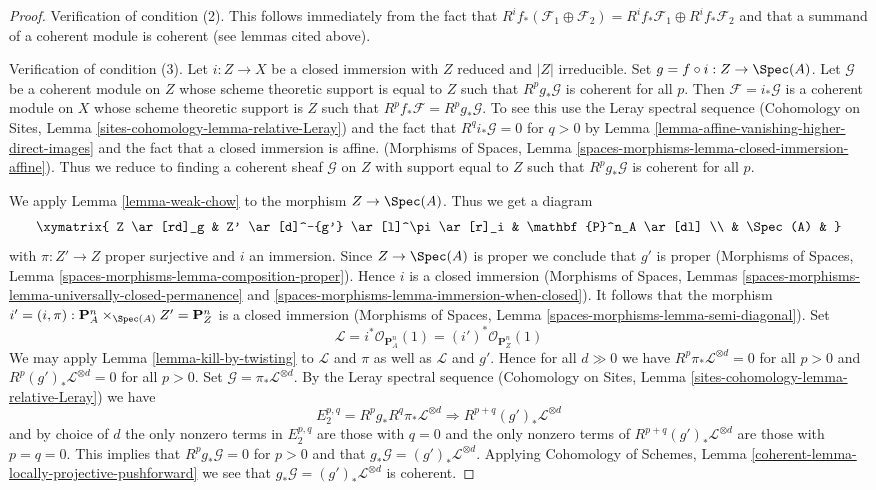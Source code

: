 \begin{proof}
\medskip\noindent
Verification of condition (2). This follows immediately from the fact
that $R^if_*(\mathcal{F}_1 \oplus \mathcal{F}_2) =
R^if_*\mathcal{F}_1 \oplus R^if_*\mathcal{F}_2$ and that a summand
of a coherent module is coherent (see lemmas cited above).

\medskip\noindent
Verification of condition (3). Let $i : Z \to X$ be a closed immersion
with $Z$ reduced and $|Z|$ irreducible. Set $g = f \circ i : Z \to \Spec(A)$.
Let $\mathcal{G}$ be a coherent module on $Z$ whose scheme theoretic support
is equal to $Z$ such that $R^pg_*\mathcal{G}$ is coherent for all $p$.
Then $\mathcal{F} = i_*\mathcal{G}$ is a coherent module on
$X$ whose scheme theoretic support is $Z$ such that
$R^pf_*\mathcal{F} = R^pg_*\mathcal{G}$. To see this use
the Leray spectral sequence
(Cohomology on Sites, Lemma \ref{sites-cohomology-lemma-relative-Leray})
and the fact that $R^qi_*\mathcal{G} = 0$ for $q > 0$ by
Lemma \ref{lemma-affine-vanishing-higher-direct-images}
and the fact that a closed immersion is affine.
(Morphisms of Spaces, Lemma
\ref{spaces-morphisms-lemma-closed-immersion-affine}).
Thus we reduce to finding a coherent sheaf $\mathcal{G}$ on $Z$
with support equal to $Z$ such that $R^pg_*\mathcal{G}$ is coherent
for all $p$.

\medskip\noindent
We apply Lemma \ref{lemma-weak-chow} to the morphism $Z \to \Spec(A)$.
Thus we get a diagram
$$
\xymatrix{
Z \ar[rd]_g & Z' \ar[d]^-{g'} \ar[l]^\pi \ar[r]_i & \mathbf{P}^n_A \ar[dl] \\
& \Spec(A) &
}
$$
with $\pi : Z' \to Z$ proper surjective and $i$ an immersion.
Since $Z \to \Spec(A)$ is proper we conclude that $g'$ is proper
(Morphisms of Spaces, Lemma \ref{spaces-morphisms-lemma-composition-proper}).
Hence $i$ is a closed immersion
(Morphisms of Spaces, Lemmas
\ref{spaces-morphisms-lemma-universally-closed-permanence} and
\ref{spaces-morphisms-lemma-immersion-when-closed}).
It follows that the morphism
$i' = (i, \pi) : \mathbf{P}^n_A \times_{\Spec(A)} Z' = \mathbf{P}^n_Z$ is
a closed immersion
(Morphisms of Spaces, Lemma \ref{spaces-morphisms-lemma-semi-diagonal}).
Set
$$
\mathcal{L} =
i^*\mathcal{O}_{\mathbf{P}^n_A}(1) =
(i')^*\mathcal{O}_{\mathbf{P}^n_Z}(1)
$$
We may apply Lemma \ref{lemma-kill-by-twisting}
to $\mathcal{L}$ and $\pi$ as well as $\mathcal{L}$ and $g'$.
Hence for all $d \gg 0$ we have
$R^p\pi_*\mathcal{L}^{\otimes d} = 0$ for all $p > 0$ and
$R^p(g')_*\mathcal{L}^{\otimes d} = 0$ for all $p > 0$.
Set $\mathcal{G} = \pi_*\mathcal{L}^{\otimes d}$.
By the Leray spectral sequence
(Cohomology on Sites, Lemma \ref{sites-cohomology-lemma-relative-Leray})
we have
$$
E_2^{p, q} = R^pg_* R^q\pi_*\mathcal{L}^{\otimes d}
\Rightarrow
R^{p + q}(g')_*\mathcal{L}^{\otimes d}
$$
and by choice of $d$ the only nonzero terms in $E_2^{p, q}$ are
those with $q = 0$ and the only nonzero terms of
$R^{p + q}(g')_*\mathcal{L}^{\otimes d}$ are those with $p = q = 0$.
This implies that $R^pg_*\mathcal{G} = 0$ for $p > 0$ and
that $g_*\mathcal{G} = (g')_*\mathcal{L}^{\otimes d}$.
Applying
Cohomology of Schemes, Lemma
\ref{coherent-lemma-locally-projective-pushforward}
we see that $g_*\mathcal{G} = (g')_*\mathcal{L}^{\otimes d}$ is
coherent.


\end{proof}
